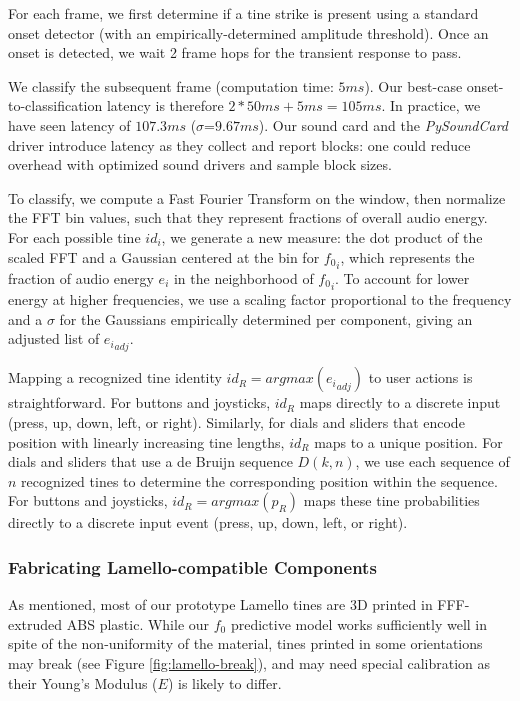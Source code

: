     For each frame, we first determine if a tine strike is present using a standard onset detector (with an empirically-determined amplitude threshold). Once an onset is detected, we wait 2 frame hops for the transient response to pass.
    
    We classify the subsequent frame (computation time: $5ms$). Our best-case onset-to-classification latency is therefore $2 * 50ms + 5ms = 105ms$.  In practice, we have seen latency of $107.3ms$ ($\sigma$=$9.67ms$). Our sound card and the \emph{PySoundCard} driver introduce latency as they collect and report blocks: one could reduce overhead with optimized sound drivers and sample block sizes.

    To classify, we compute a Fast Fourier Transform on the window, then normalize the FFT bin values, such that they represent fractions of overall audio energy. For each possible tine $id_i$, we generate a new measure: the dot product of the scaled FFT and a Gaussian centered at the bin for ${f_0}_i$, which represents the fraction of audio energy $e_i$ in the neighborhood of ${f_0}_i$. To account for lower energy at higher frequencies, we use a scaling factor proportional to the frequency and a $\sigma$ for the Gaussians empirically determined per component, giving an adjusted list of ${e_i}_{adj}$. 

    Mapping a recognized tine identity $id_R=argmax({e_i}_{adj})$ to user actions is straightforward. For buttons and joysticks, $id_R$ maps directly to a discrete input (press, up, down, left, or right). Similarly, for dials and sliders that encode position with linearly increasing tine lengths, $id_R$ maps to a unique position. For dials and sliders that use a de Bruijn sequence $D(k, n)$, we use each sequence of $n$ recognized tines to determine the corresponding position within the sequence. For buttons and joysticks, $id_R=argmax(p_R)$ maps these tine probabilities directly to a discrete input event (press, up, down, left, or right).

    \subsubsection{Fabricating Lamello-compatible Components}
    
    As mentioned, most of our prototype Lamello tines are 3D printed in FFF-extruded ABS plastic. While our $f_0$ predictive model works sufficiently well in spite of the non-uniformity of the material, tines printed in some orientations may break (see Figure \ref{fig:lamello-break}), and may need special calibration as their Young's Modulus ($E$) is likely to differ.
    
